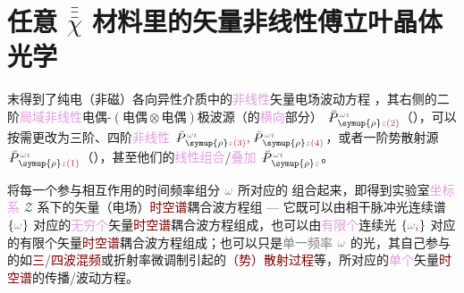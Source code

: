 \chapter{任意 \texorpdfstring{$\bar{\bar{\bar{\chi}}}$}{$\bar{\bar{\bar{\text{χ}}}}$} 材料里的矢量非线性傅立叶晶体光学}\label{chap:NFCO}

 末得到了\textcolor{PineGreen}{纯电（非磁）各向异性}介质中的\textcolor{Plum}{非线性}矢量电场波动方程 ，其右侧的二阶\textcolor{Plum}{局域}\textcolor{Plum}{非线性}\textcolor{NavyBlue}{电偶-$(\text{电偶}\otimes\text{电偶})$}极\textcolor{NavyBlue}{波源}（的\textcolor{Plum}{横向}部分） $\Xint{\mathcolor{gray}{-}}{25}{\bar{P}}^{\;\! \mathcolor{gray}{\omega} \textcolor{PineGreen}{\imath}}_{\;\! \symup{\rho} \mathcolor{gray}{z} \textcolor{Maroon}{(2)}}$（），可以按需更改为三阶、四阶\textcolor{Plum}{非线性} $\Xint{\mathcolor{gray}{-}}{25}{\bar{P}}^{\;\! \mathcolor{gray}{\omega} \textcolor{PineGreen}{\imath}}_{\;\! \symup{\rho} \mathcolor{gray}{z} \textcolor{Maroon}{(3)}}, \Xint{\mathcolor{gray}{-}}{25}{\bar{P}}^{\;\! \mathcolor{gray}{\omega} \textcolor{PineGreen}{\imath}}_{\;\! \symup{\rho} \mathcolor{gray}{z} \textcolor{Maroon}{(4)}}$，或者一阶\textcolor{NavyBlue}{势散射}源 $\Xint{\mathcolor{gray}{-}}{25}{\bar{P}}^{\;\! \mathcolor{gray}{\omega} \textcolor{PineGreen}{\imath}}_{\;\! \symup{\rho} \mathcolor{gray}{z} \textcolor{Maroon}{(1)}}$（），甚至他们的\textcolor{Plum}{线性组合}/\textcolor{Plum}{叠加} $\Xint{\mathcolor{gray}{-}}{25}{\bar{P}}^{\;\! \mathcolor{gray}{\omega} \textcolor{PineGreen}{\imath}}_{\;\! \symup{\rho} \mathcolor{gray}{z}}$。

将每一个参与相互作用的时间频率组分 $\mathcolor{gray}{\omega}$ 所对应的  组合起来，即得到\textcolor{PineGreen}{实验室}\textcolor{Plum}{坐标系} \textcolor{PineGreen}{$\mathcal{Z}$ 系}下的矢量（电场）\textcolor{Maroon}{时空谱}耦合波方程组 --- 它既可以由相干脉冲光连续谱 $\{ \mathcolor{gray}{\omega} \}$ 对应的\textcolor{Plum}{无穷个}矢量\textcolor{Maroon}{时空谱}耦合波方程组成，也可以由\textcolor{Plum}{有限个}连续光 $\{ \mathcolor{gray}{\omega}_{\textcolor{Maroon}{i}} \}$ 对应的有限个矢量\textcolor{Maroon}{时空谱}耦合波方程组成；也可以只是\textcolor{gray}{单一频率} $\mathcolor{gray}{\omega}$ 的光，其自己参与的如\textcolor{Maroon}{三}/\textcolor{Maroon}{四波混频}或\textcolor{PineGreen}{折射率微调制}引起的\textcolor{Maroon}{（势）散射过程}等，所对应的\textcolor{Plum}{单个}矢量\textcolor{Maroon}{时空谱}的传播/波动方程。

